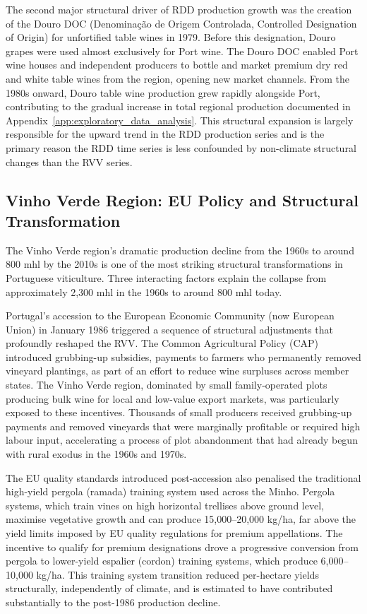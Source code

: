 The second major structural driver of RDD production growth was the creation of the Douro DOC (Denomina\c{c}\~ao de Origem Controlada, Controlled Designation of Origin) for unfortified table wines in 1979. Before this designation, Douro grapes were used almost exclusively for Port wine. The Douro DOC enabled Port wine houses and independent producers to bottle and market premium dry red and white table wines from the region, opening new market channels. From the 1980s onward, Douro table wine production grew rapidly alongside Port, contributing to the gradual increase in total regional production documented in Appendix~\ref{app:exploratory_data_analysis}. This structural expansion is largely responsible for the upward trend in the RDD production series and is the primary reason the RDD time series is less confounded by non-climate structural changes than the RVV series.


\subsection{Vinho Verde Region: EU Policy and Structural Transformation}\label{sub:vinho_verde_region_eu}

The Vinho Verde region's dramatic production decline from the 1960s to around 800 mhl by the 2010s is one of the most striking structural transformations in Portuguese viticulture. Three interacting factors explain the collapse from approximately 2,300 mhl in the 1960s to around 800 mhl today.

Portugal's accession to the European Economic Community (now European Union) in January 1986 triggered a sequence of structural adjustments that profoundly reshaped the RVV. The Common Agricultural Policy (CAP) introduced grubbing-up subsidies, payments to farmers who permanently removed vineyard plantings, as part of an effort to reduce wine surpluses across member states. The Vinho Verde region, dominated by small family-operated plots producing bulk wine for local and low-value export markets, was particularly exposed to these incentives. Thousands of small producers received grubbing-up payments and removed vineyards that were marginally profitable or required high labour input, accelerating a process of plot abandonment that had already begun with rural exodus in the 1960s and 1970s.

The EU quality standards introduced post-accession also penalised the traditional high-yield pergola (ramada) training system used across the Minho. Pergola systems, which train vines on high horizontal trellises above ground level, maximise vegetative growth and can produce 15,000--20,000 kg/ha, far above the yield limits imposed by EU quality regulations for premium appellations. The incentive to qualify for premium designations drove a progressive conversion from pergola to lower-yield espalier (cordon) training systems, which produce 6,000--10,000 kg/ha. This training system transition reduced per-hectare yields structurally, independently of climate, and is estimated to have contributed substantially to the post-1986 production decline.

